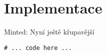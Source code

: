 \chapter{Implementace}
\begin{listing}[htbp]
\caption{\label{code:foo}Minted: Nyní ještě křupavější}
\begin{verbatim}
# ... code here ...
\end{verbatim}
\end{listing}